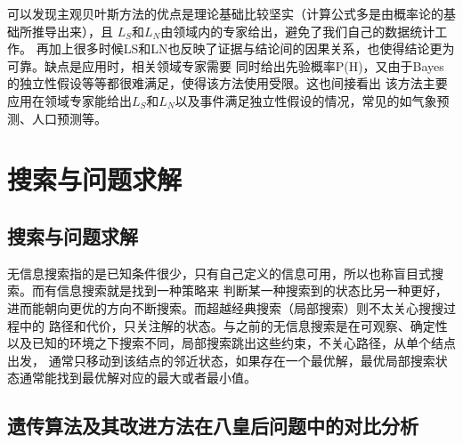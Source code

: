 \documentclass[12pt,a4paper,UTF8]{ctexart}
\begin{document}
可以发现主观贝叶斯方法的优点是理论基础比较坚实（计算公式多是由概率论的基础所推导出来），且
$ L_S $和$ L_N $由领域内的专家给出，避免了我们自己的数据统计工作。
再加上很多时候LS和LN也反映了证据与结论间的因果关系，也使得结论更为可靠。缺点是应用时，相关领域专家需要
同时给出先验概率P(H)，又由于Bayes的独立性假设等等都很难满足，使得该方法使用受限。这也间接看出
该方法主要应用在领域专家能给出$ L_S $和$ L_N $以及事件满足独立性假设的情况，常见的如气象预测、人口预测等。

\section{搜索与问题求解}
\subsection{搜索与问题求解}
无信息搜索指的是已知条件很少，只有自己定义的信息可用，所以也称盲目式搜索。而有信息搜索就是找到一种策略来
判断某一种搜索到的状态比另一种更好，进而能朝向更优的方向不断搜索。而超越经典搜索（局部搜索）则不太关心搜搜过程中的
路径和代价，只关注解的状态。与之前的无信息搜索是在可观察、确定性以及已知的环境之下搜索不同，局部搜索跳出这些约束，不关心路径，从单个结点出发，
通常只移动到该结点的邻近状态，如果存在一个最优解，最优局部搜索状态通常能找到最优解对应的最大或者最小值。
\subsection{遗传算法及其改进方法在八皇后问题中的对比分析}
\end{document}
